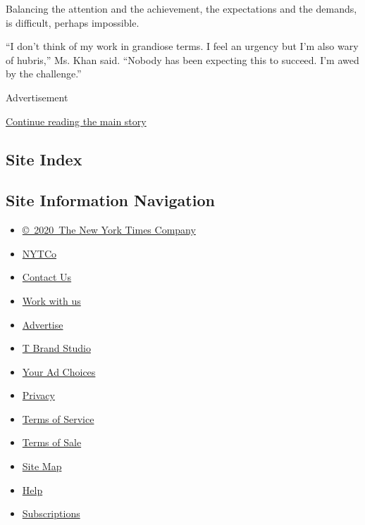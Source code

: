 Balancing the attention and the achievement, the expectations and the
demands, is difficult, perhaps impossible.

``I don't think of my work in grandiose terms. I feel an urgency but I'm
also wary of hubris,'' Ms. Khan said. ``Nobody has been expecting this
to succeed. I'm awed by the challenge.''

Advertisement

\protect\hyperlink{after-bottom}{Continue reading the main story}

\hypertarget{site-index}{%
\subsection{Site Index}\label{site-index}}

\hypertarget{site-information-navigation}{%
\subsection{Site Information
Navigation}\label{site-information-navigation}}

\begin{itemize}
\tightlist
\item
  \href{https://help.nytimes3xbfgragh.onion/hc/en-us/articles/115014792127-Copyright-notice}{©~2020~The
  New York Times Company}
\end{itemize}

\begin{itemize}
\tightlist
\item
  \href{https://www.nytco.com/}{NYTCo}
\item
  \href{https://help.nytimes3xbfgragh.onion/hc/en-us/articles/115015385887-Contact-Us}{Contact
  Us}
\item
  \href{https://www.nytco.com/careers/}{Work with us}
\item
  \href{https://nytmediakit.com/}{Advertise}
\item
  \href{http://www.tbrandstudio.com/}{T Brand Studio}
\item
  \href{https://www.nytimes3xbfgragh.onion/privacy/cookie-policy\#how-do-i-manage-trackers}{Your
  Ad Choices}
\item
  \href{https://www.nytimes3xbfgragh.onion/privacy}{Privacy}
\item
  \href{https://help.nytimes3xbfgragh.onion/hc/en-us/articles/115014893428-Terms-of-service}{Terms
  of Service}
\item
  \href{https://help.nytimes3xbfgragh.onion/hc/en-us/articles/115014893968-Terms-of-sale}{Terms
  of Sale}
\item
  \href{https://spiderbites.nytimes3xbfgragh.onion}{Site Map}
\item
  \href{https://help.nytimes3xbfgragh.onion/hc/en-us}{Help}
\item
  \href{https://www.nytimes3xbfgragh.onion/subscription?campaignId=37WXW}{Subscriptions}
\end{itemize}
